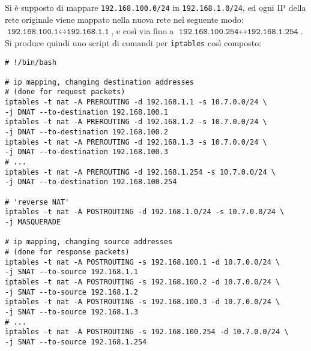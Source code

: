 Si è supposto di mappare \texttt{192.168.100.0/24} in \texttt{192.168.1.0/24},
ed ogni IP della rete originale viene mappato nella nuova rete nel seguente
modo: $\texttt{192.168.100.1} \leftrightarrow \texttt{192.168.1.1}$, e così via
fino a $\texttt{192.168.100.254} \leftrightarrow \texttt{192.168.1.254}$.
Si produce quindi uno script di comandi per \texttt{iptables} così composto:
\begin{verbatim}
# !/bin/bash

# ip mapping, changing destination addresses
# (done for request packets)
iptables -t nat -A PREROUTING -d 192.168.1.1 -s 10.7.0.0/24 \
-j DNAT --to-destination 192.168.100.1
iptables -t nat -A PREROUTING -d 192.168.1.2 -s 10.7.0.0/24 \
-j DNAT --to-destination 192.168.100.2
iptables -t nat -A PREROUTING -d 192.168.1.3 -s 10.7.0.0/24 \
-j DNAT --to-destination 192.168.100.3
# ...
iptables -t nat -A PREROUTING -d 192.168.1.254 -s 10.7.0.0/24 \
-j DNAT --to-destination 192.168.100.254

# 'reverse NAT'
iptables -t nat -A POSTROUTING -d 192.168.1.0/24 -s 10.7.0.0/24 \
-j MASQUERADE

# ip mapping, changing source addresses
# (done for response packets)
iptables -t nat -A POSTROUTING -s 192.168.100.1 -d 10.7.0.0/24 \
-j SNAT --to-source 192.168.1.1
iptables -t nat -A POSTROUTING -s 192.168.100.2 -d 10.7.0.0/24 \
-j SNAT --to-source 192.168.1.2
iptables -t nat -A POSTROUTING -s 192.168.100.3 -d 10.7.0.0/24 \
-j SNAT --to-source 192.168.1.3
# ...
iptables -t nat -A POSTROUTING -s 192.168.100.254 -d 10.7.0.0/24 \
-j SNAT --to-source 192.168.1.254
\end{verbatim}
